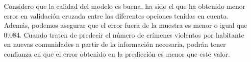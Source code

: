\documentclass[a4paper, 20pt]{article}
\begin{document}
Considero que la calidad del modelo es buena, ha sido el que ha obtenido menor error en validación cruzada entre las diferentes opciones tenidas en cuenta. Además, podemos asegurar que el error fuera de la muestra es menor o igual que 0.084. Cuando traten de predecir el número de crímenes violentos por habitante en nuevas comunidades a partir de la información necesaria, podrán tener confianza en que el error obtenido en la predicción es menor que este valor.
\newpage

\printbibliography
\end{document}
